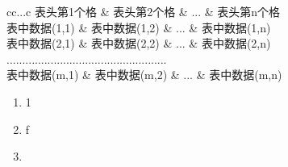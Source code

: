 \documentclass{cumcmthesis} %
\begin{document}
\begin{tcode}
    \begin{table}[H]
        \caption[标签名]{中文标题}
        \begin{tabular}{cc...c}
            \toprule[1.5pt]
            表头第1个格   & 表头第2个格   & ... & 表头第n个格   \\
            \midrule[1pt]
            表中数据(1,1) & 表中数据(1,2) & ... & 表中数据(1,n) \\
            表中数据(2,1) & 表中数据(2,2) & ... & 表中数据(2,n) \\
            ................................................... \\
            表中数据(m,1) & 表中数据(m,2) & ... & 表中数据(m,n) \\
            \bottomrule[1.5pt]
        \end{tabular}
    \end{table}
\end{tcode}



\begin{enumerate}[1.]\setlength{\itemsep}{0pt}
    \item 1
    \item    f
    \item
\end{enumerate}

\begin{table}[H]
    \centering
    \caption{\href{https://www.tablesgenerator.com/latex_tables}{网站生成图表，点击进入}}
    \label{tab:my-table}
\end{table}
\end{document}
